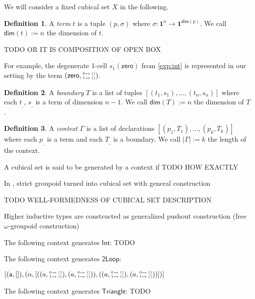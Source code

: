 \documentclass[11pt]{article}
\theoremstyle{definition}
\newtheorem{definition}{Definition}
\newcommand{\continuation}{??}
\newenvironment{examplecontd}[1]
{\renewcommand{\continuation}{\ref{#1}}\expcont[continued]}
{\endexpcont}
\newcommand{\mdef}{:=}
\newcommand{\mname}[1]{\textit{{#1}}}
\newcommand{\pint}[1]{\mathbf{1}^{#1}}
\renewcommand{\dim}[1]{\mathsf{dim}({#1})}
\newcommand{\ctxtdim}[1]{|{#1}|}
\newcommand{\smap}[1]{s_{{#1}}}
\newcommand{\cset}[1]{\mathsf{{#1}}}
\newcommand{\substtwo}[2]{\tiny
  \arraycolsep=.4pt\def\arraystretch{1}
  \begin{array}{ll}
    0 &\mapsto {#1} \\
    1 &\mapsto {#2}
  \end{array}
}
\newcommand{\constzero}{\substtwo{()}{()}}
\begin{document}
We will consider a fixed cubical set $X$ in the following.

\begin{definition}
  A \mname{term} $t$ is a tuple $(p, \sigma)$ where $\sigma : \pint{n} \to
  \pint{\dim{p}}$. We call $\dim{t} \mdef n$ the dimension of $t$.

  TODO OR IT IS COMPOSITION OF OPEN BOX
\end{definition}

For example, the degenerate 1-cell $\smap{1}(\cset{zero})$ from \autoref{exp:int}
is represented in our setting by the term $(\cset{zero}, \constzero)$.

\begin{definition}
  A \mname{boundary} $T$ is a list of tuples $[(t_1,s_1) , \ldots , (t_n,s_n)]$
  where each $t_\_$, $s_\_$ is a term of dimension $n-1$. We call $\dim{T} \mdef n$ the dimension of $T$.
\end{definition}

\begin{definition}
  A \mname{context} $\Gamma$ is a list of declarations $[ (p_1,T_1) , \ldots , (p_k,T_k)]$
  where each $p_\_$ is a term and each $T_\_$ is a boundary. We call
  $\ctxtdim{\Gamma} \mdef k$ the length of the context.
\end{definition}

A cubical set is said to be generated by a context if TODO HOW EXACTLY

In \cite[Sect. 6.4]{bezem14_model_type_theor_cubic_sets}, strict groupoid turned into
cubical set with general construction

TODO WELL-FORMEDNESS OF CUBICAL SET DESCRIPTION

Higher inductive types are constructed as generalized pushout construction (free
$\omega$-groupoid construction)

\begin{examplecontd}{exp:int}
  The following context generates $\cset{Int}$: TODO
\end{examplecontd}

\begin{examplecontd}{exp:loopspace}
  The following context generates $\cset{2Loop}$:

  $[ (\cset{a},[]) , (\cset{\alpha} , [ ((a, \constzero) , (a, \constzero)) ,
  ((a, \constzero), (a, \constzero)) ])]$
  
\end{examplecontd}

\begin{examplecontd}{exp:triangle}
  The following context generates $\cset{Triangle}$: TODO 
\end{examplecontd}
\end{document}
